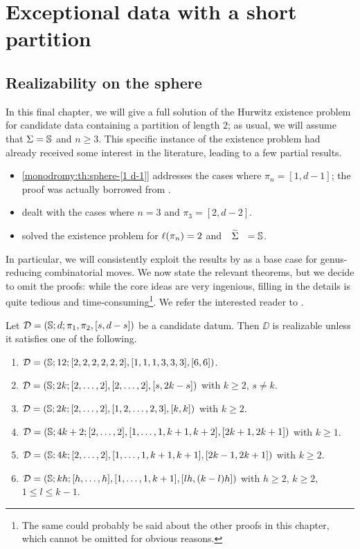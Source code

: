 \chapter{Exceptional data with a short partition}\label{short-partition:ch}

\section{Realizability on the sphere}

In this final chapter, we will give a full solution of the Hurwitz existence problem for candidate data containing a partition of length $2$; as usual, we will assume that $\Sigma=\mathbb{S}{}$ and $n\ge 3$. This specific instance of the existence problem had already received some interest in the literature, leading to a few partial results.
\begin{itemize}
\item \cref{monodromy:th:sphere-[1 d-1]} addresses the cases where $\pi_n=[1,d-1]$; the proof was actually borrowed from .
\item \textcite{pervova-existence-ii} dealt with the cases where $n=3$ and $\pi_3=[2,d-2]$.
\item \textcite{pakovich} solved the existence problem for $\ell(\pi_n)=2$ and $\tSigma=\sphere{}$.
\end{itemize}
In particular, we will consistently exploit the results by \citeauthor{pakovich} as a base case for genus-reducing combinatorial moves. We now state the relevant theorems, but we decide to omit the proofs: while the core ideas are very ingenious, filling in the details is quite tedious and time-consuming\footnote{The same could probably be said about the other proofs in this chapter, which cannot be omitted for obvious reasons.}. We refer the interested reader to \cite{pakovich}.

\begin{theorem}\label{short-partition:th:realizability-on-sphere-n-3}
Let $\mathcal{D}=(\mathbb{S}{};d;\pi_1,\pi_2,[s,d-s])$ be a candidate datum. Then $\DD$ is realizable unless it satisfies one of the following.
\begin{enumerate}[(1)]
\item $\mathcal{D}=(\mathbb{S}{};12;[2,2,2,2,2,2],[1,1,1,3,3,3],[6,6])$.
\item $\mathcal{D}=(\mathbb{S}{};2k;[2,\ldots,2],[2,\ldots,2],[s,2k-s])$ with $k\ge 2$, $s\neq k$.
\item $\mathcal{D}=(\mathbb{S}{};2k;[2,\ldots,2],[1,2,\ldots,2,3],[k,k])$ with $k\ge2$.
\item $\mathcal{D}=(\mathbb{S}{};4k+2;[2,\ldots,2],[1,\ldots,1,k+1,k+2],[2k+1,2k+1])$ with $k\ge 1$.
\item $\mathcal{D}=(\mathbb{S}{};4k;[2,\ldots,2],[1,\ldots,1,k+1,k+1],[2k-1,2k+1])$ with $k\ge2$.
\item\label{short-partition:th:realizability-on-sphere-n-3:it:6} $\mathcal{D}=(\mathbb{S}{};kh;[h,\ldots,h],[1,\ldots,1,k+1],[lh,(k-l)h])$ with $h\ge 2$, $k\ge 2$, $1\le l\le k-1$.
\end{enumerate}
\end{theorem}

